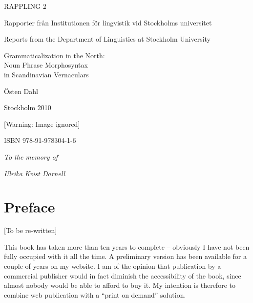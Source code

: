 

RAPPLING 2

\begin{stylePa}
Rapporter från Institutionen för lingvistik vid Stockholms universitet

\end{stylePa}

\begin{stylePa}
Reports from the Department of Linguistics at Stockholm University

\end{stylePa}

\hypertarget{Toc264376056}{}Grammaticalization in the North:\\
Noun Phrase Morphosyntax\\
in Scandinavian Vernaculars

Östen Dahl

Stockholm 2010

  [Warning: Image ignored] %
 

ISBN 978-91-978304-1-6
 

\itshape
To the memory of

\itshape
Ulrika Kvist Darnell

\chapter[Preface]{Preface}

[To be re-written]

\begin{styleBodyTextFirst}
This book has taken more than ten years to complete – obviously I have not been fully occupied with it all the time. A preliminary version has been available for a couple of years on my website. I am of the opinion that publication by a commercial publisher would in fact diminish the accessibility of the book, since almost nobody would be able to afford to buy it. My intention is therefore to combine web publication with a “print on demand” solution. 

\end{styleBodyTextFirst}

